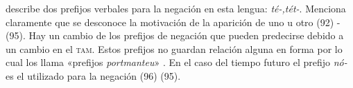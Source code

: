 \textcolor{MidnightBlue}{\citet{Tlahuica}} describe dos prefijos verbales para la negación en esta lengua: {\setmainfont{Charis SIL} \textit{té-,tét-}}. Menciona claramente que se desconoce la motivación de la aparición de uno u otro (92) - (95). Hay un cambio de los prefijos de negación que pueden predecirse debido a un cambio en el \textsc{tam}. Estos prefijos no guardan relación alguna en forma por lo cual los llama «prefijos \textit{portmanteu}» \textcolor{MidnightBlue}{\citep[pág. 200]{Tlahuica}}. En el caso del tiempo futuro el prefijo {\setmainfont{Charis SIL} \textit{nó-}} es el utilizado para la negación (96) (95).